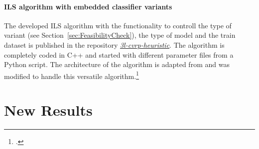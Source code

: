 \subsubsection{ILS algorithm with embedded classifier variants}
The developed \gls{ILS} algorithm with the functionality to controll the type of variant (see Section~\ref{sec:FeasibilityCheck}), the type
of model and the train dataset is published in the repository \href{https://github.com/MxHbm/3l-cvrp-heuristic}{\textit{3l-cvrp-heuristic}}.
The algorithm is completely coded in C++ and started with different parameter files from a Python script. The architecture of the algorithm is
adapted from \cite{tamke_repository_2024} and was modified to handle this versatile algorithm.\footcite[cf.][]{tamke_repository_2024}

\clearpage
\chapter{New Results}
